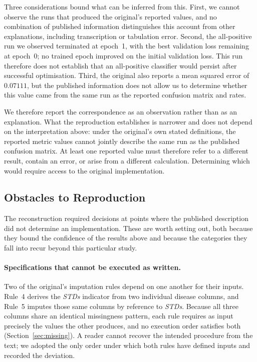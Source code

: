 Three considerations bound what can be inferred from this. First, we cannot
observe the runs that produced the original's reported values, and no
combination of published information distinguishes this account from other
explanations, including transcription or tabulation error. Second, the
all-positive run we observed terminated at epoch~1, with the best validation
loss remaining at epoch~0; no trained epoch improved on the initial validation
loss. This run therefore does not establish that an all-positive classifier
would persist after successful optimisation. Third, the original also reports a
mean squared error of $0.07111$, but the published information does not allow
us to determine whether this value came from the same run as the reported
confusion matrix and rates.

We therefore report the correspondence as an observation rather than as an
explanation. What the reproduction establishes is narrower and does not depend
on the interpretation above: under the original's own stated definitions, the
reported metric values cannot jointly describe the same run as the published
confusion matrix. At least one reported value must therefore refer to a
different result, contain an error, or arise from a different calculation.
Determining which would require access to the original implementation.

\subsection{Obstacles to Reproduction}\label{sec:obstacles}

The reconstruction required decisions at points where the published description
did not determine an implementation. These are worth setting out, both because
they bound the confidence of the results above and because the categories they
fall into recur beyond this particular study.

\paragraph{Specifications that cannot be executed as written.} Two of the
original's imputation rules depend on one another for their inputs. Rule~4
derives the \emph{STDs} indicator from two individual disease columns, and
Rule~5 imputes those same columns by reference to \emph{STDs}. Because all
three columns share an identical missingness pattern, each rule requires as
input precisely the values the other produces, and no execution order satisfies
both (Section~\ref{sec:missing}). A reader cannot recover the intended
procedure from the text; we adopted the only order under which both rules have
defined inputs and recorded the deviation.

